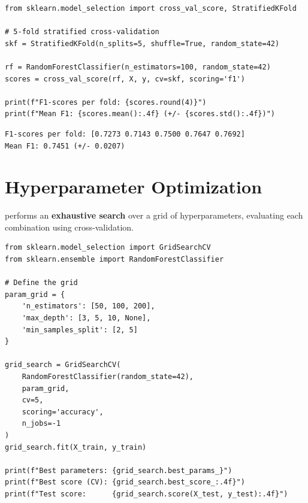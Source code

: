 \begin{codeblock}[title=\textbf{Python}]
\begin{verbatim}
from sklearn.model_selection import cross_val_score, StratifiedKFold

# 5-fold stratified cross-validation
skf = StratifiedKFold(n_splits=5, shuffle=True, random_state=42)

rf = RandomForestClassifier(n_estimators=100, random_state=42)
scores = cross_val_score(rf, X, y, cv=skf, scoring='f1')

print(f"F1-scores per fold: {scores.round(4)}")
print(f"Mean F1: {scores.mean():.4f} (+/- {scores.std():.4f})")
\end{verbatim}
\end{codeblock}

\begin{codeoutput}
\begin{verbatim}
F1-scores per fold: [0.7273 0.7143 0.7500 0.7647 0.7692]
Mean F1: 0.7451 (+/- 0.0207)
\end{verbatim}
\end{codeoutput}

\section{Hyperparameter Optimization}
\label{sec:gridsearch}


\begin{definition}[GridSearchCV]
 performs an \textbf{exhaustive search} over a grid of hyperparameters, evaluating each combination using cross-validation.
\end{definition}

\begin{codeblock}[title=\textbf{Python}]
\begin{verbatim}
from sklearn.model_selection import GridSearchCV
from sklearn.ensemble import RandomForestClassifier

# Define the grid
param_grid = {
    'n_estimators': [50, 100, 200],
    'max_depth': [3, 5, 10, None],
    'min_samples_split': [2, 5]
}

grid_search = GridSearchCV(
    RandomForestClassifier(random_state=42),
    param_grid,
    cv=5,
    scoring='accuracy',
    n_jobs=-1
)
grid_search.fit(X_train, y_train)

print(f"Best parameters: {grid_search.best_params_}")
print(f"Best score (CV): {grid_search.best_score_:.4f}")
print(f"Test score:      {grid_search.score(X_test, y_test):.4f}")
\end{verbatim}
\end{codeblock}

